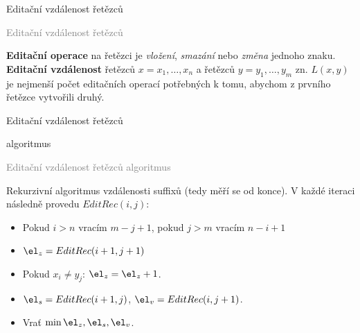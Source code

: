\documentclass[20pt]{extarticle}
\newcommand{\card}[3][]{
	\vspace*{\fill}

	\newpage
	\topskip0pt
	\vspace*{\fill}
		\Large #2

		\vspace{1cm}
		\normalsize #1
	\vspace*{\fill}
	\newpage

	\small \textcolor{gray}{#2 #1}
	\topskip0pt
	\vspace*{\fill}

	\normalsize
	#3
	\vspace*{\fill}
}
\begin{document}
\begin{center}
\card{Editační vzdálenost řetězců}{
	\textbf{Editační operace} na řetězci je \textit{vložení}, \textit{smazání} nebo
	\textit{změna} jednoho znaku. \textbf{Editační vzdálenost} řetězců $x=x_1, \dots, x_n$
	a řetězců $y=y_1, \dots, y_m$ zn. $L(x, y)$ je nejmenší počet editačních operací
	potřebných k tomu, abychom z prvního řetězce vytvořili druhý.
}

\card[algoritmus]{Editační vzdálenost řetězců}{
	\small
	Rekurzivní algoritmus vzdálenosti suffixů (tedy měří se od konce). V každé iteraci
	následně provedu $EditRec(i,j)$:
	\begin{itemize}
		\item Pokud $i > n$ vracím $m-j+1$, pokud $j > m$ vracím $n-i+1$
		\item $\el_{z} = EditRec(i+1, j+1)$
		\item Pokud $x_i \neq y_j$: $\el_z = \el_z + 1$.
		\item $\el_s = EditRec(i+1, j)$, $\el_v = EditRec(i, j+1)$.
		\item Vrať $\min{\el_z, \el_s, \el_v}$.
	\end{itemize}
}

\end{center}
\end{document}
